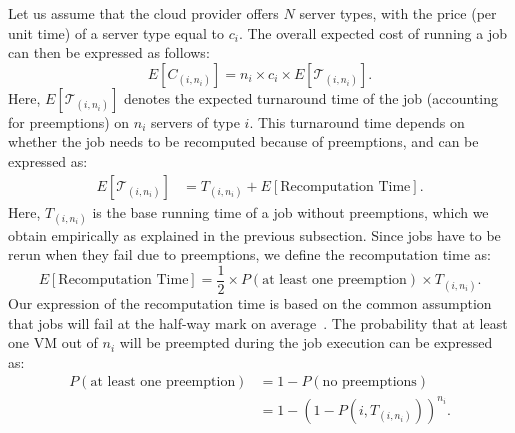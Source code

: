 

Let us assume that the cloud provider offers $N$ server types, with the price (per unit time) of a server type equal to $c_i$. 
The overall expected cost of running a job can then be expressed as follows:
\begin{equation}
  \label{eq:e-cost}
  E[C_{( i,n_i )}] = n_i\times c_i \times E[\mathcal{T}_{( i,n_i )}].
\end{equation}
Here, $E[\mathcal{T}_{( i,n_i )}]$ denotes the expected turnaround time of the job (accounting for preemptions) on $n_i$ servers of type $i$.
%
This turnaround time depends on whether the job needs to be recomputed because of preemptions, and can be expressed as:
\begin{align}
  \label{eq:turnaround}
  E[\mathcal{T}_{( i,n_i )}] &= T_{( i,n_i )} + E[\text{Recomputation Time}].
\end{align}
Here, $T_{( i,n_i )}$ is the base running time of a job without preemptions, which we obtain empirically as explained in the previous subsection.
Since jobs have to be rerun when they fail due to preemptions, we define the recomputation time as:
\begin{equation}
  \label{eq:recomput}
   E[\text{Recomputation Time}] = \frac{1}{2} \times P(\text{at least one preemption}) \times T_{( i,n_i )}.   
 \end{equation}
 Our expression of the recomputation time is based on the common assumption that jobs will fail at the half-way mark on average~\cite{daly2006higher, bougeret_checkpointing_2011}. 
%
The probability that at least one VM out of $n_i$ will be preempted during the job execution can be expressed as:
\begin{align}
  \label{eq:pfail1}
  P(\text{at least one preemption}) &= 1-P(\text{no preemptions}) \\
                                 &= 1-\left(1-P\left(i,T_{(i, n_i)}\right)\right)^{n_i}.
\end{align}

